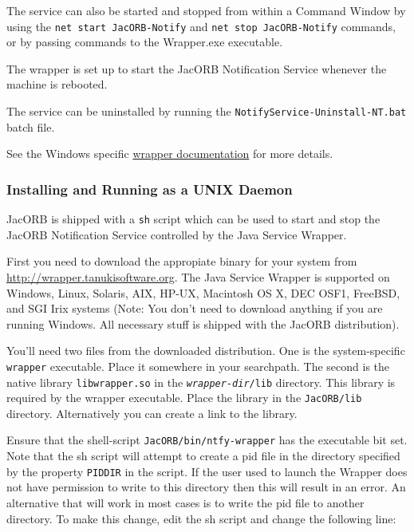 The service can also be started and stopped from within a Command
Window by using the \texttt{net start JacORB-Notify} and \texttt{net
  stop JacORB-Notify} commands, or 
by passing commands to the Wrapper.exe executable. 

The wrapper is set up to start the JacORB Notification Service
whenever the machine is rebooted.

The service can be uninstalled by running the
\texttt{NotifyService-Uninstall-NT.bat} batch file.

See the Windows specific
\href{http://wrapper.tanukisoftware.org/doc/english/launch-win.html}{wrapper
  documentation} for more details.
  

\subsubsection{Installing and Running as a UNIX Daemon}
\label{sec:inst-runn-as}

JacORB is shipped with a \texttt{sh} script which can be used to start
and stop the JacORB Notification Service controlled by the Java
Service Wrapper.

First you need to download the appropiate binary for your system from
\href{http://wrapper.tanukisoftware.org}{http://wrapper.tanukisoftware.org}.
The Java Service Wrapper is supported on Windows, Linux, Solaris, AIX,
HP-UX, Macintosh OS X, DEC OSF1, FreeBSD, and SGI Irix systems (Note:
You don't need to download anything if you are running Windows. All
necessary stuff is shipped with the JacORB distribution).

You'll need two files from the downloaded distribution. One is
the system-specific \texttt{wrapper} executable. Place it somewhere in
your searchpath. The second is the native library
\texttt{libwrapper.so} in the \texttt{\emph{wrapper-dir}/lib}
directory. This library is required by the 
wrapper executable. Place the library in the \texttt{JacORB/lib}
directory. Alternatively you can create a link to the library.

Ensure that the shell-script
\texttt{JacORB/bin/ntfy-wrapper} has the executable bit set. Note that
the sh script will attempt to create a pid file in the directory
specified by the property \texttt{PIDDIR} in the script. If
the user used to launch the Wrapper does not have permission to write
to this directory then this will result in an error. An alternative
that will work in most cases is to write the pid file to another
directory. To make this change, edit the sh  script and change the following line: 

